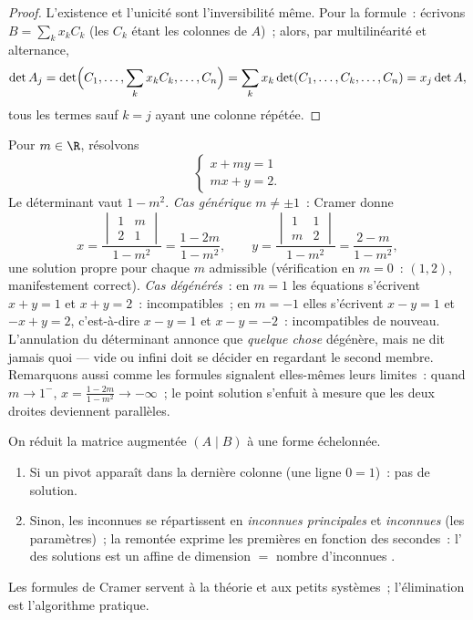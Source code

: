 \begin{proof}
L'existence et l'unicité sont l'inversibilité même. Pour la formule~:
écrivons $B = \sum_k x_k C_k$ (les $C_k$ étant les colonnes de $A$)~;
alors, par multilinéarité et alternance,
\[
\det A_j = \det\Bigl(C_1, \dots, \sum_k x_k C_k, \dots, C_n\Bigr)
= \sum_k x_k \det(C_1, \dots, C_k, \dots, C_n)
= x_j \det A ,
\]
tous les termes sauf $k = j$ ayant une colonne répétée.
\end{proof}

\begin{example}
\label{ex:b1:det:cramerparameter}
Pour $m \in \R$, résolvons
\[
\begin{cases}
x + m y = 1\\
m x + y = 2 .
\end{cases}
\]
Le déterminant vaut $1 - m^2$. \emph{Cas générique} $m \neq \pm1$~:
Cramer donne
\[
x = \frac{\begin{vmatrix} 1 & m\\ 2 & 1\end{vmatrix}}{1 - m^2}
= \frac{1 - 2m}{1 - m^2},
\qquad
y = \frac{\begin{vmatrix} 1 & 1\\ m & 2\end{vmatrix}}{1 - m^2}
= \frac{2 - m}{1 - m^2},
\]
une solution propre pour chaque $m$ admissible (vérification en
$m = 0$~: $(1, 2)$, manifestement correct). \emph{Cas dégénérés}~: en
$m = 1$ les équations s'écrivent $x + y = 1$ et $x + y = 2$~:
incompatibles~; en $m = -1$ elles s'écrivent $x - y = 1$ et
$-x + y = 2$, c'est-à-dire $x - y = 1$ et $x - y = -2$~: incompatibles
de nouveau. L'annulation du déterminant annonce que \emph{quelque
chose} dégénère, mais ne dit jamais quoi ---  vide ou
 infini doit se décider en regardant le second membre.
Remarquons aussi comme les formules signalent elles-mêmes leurs
limites~: quand $m \to 1^{-}$, $x = \frac{1 - 2m}{1 - m^2} \to
-\infty$~; le point solution s'enfuit à mesure que les deux droites
deviennent parallèles.
\end{example}

\begin{method}\label{met:b1:det:gauss}
On réduit la matrice augmentée $(A \mid B)$ à une forme
échelonnée.
\begin{enumerate}
  \item Si un pivot apparaît dans la dernière colonne (une ligne
        $0 = 1$)~: pas de solution.
  \item Sinon, les inconnues se répartissent en \emph{inconnues
        principales} et \emph{inconnues } (les paramètres)~; la
        remontée exprime les premières en fonction des secondes~:
        l' des solutions est un  affine de
        dimension $=$ nombre d'inconnues .
\end{enumerate}
Les formules de Cramer servent à la théorie et aux petits systèmes~;
l'élimination est l'algorithme pratique.
\end{method}

